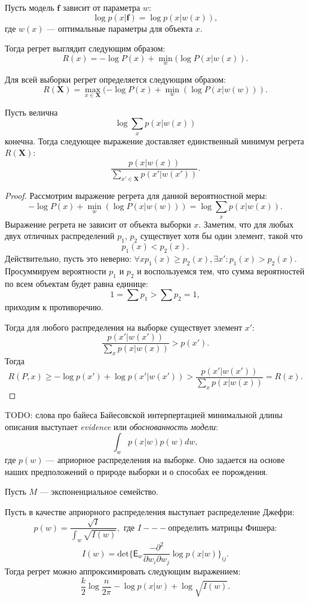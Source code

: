 \documentclass[../main.tex]{subfiles}
\begin{document}
Пусть модель $\mathbf{f}$ зависит от параметра $w$:
\[
    \log p(x|\mathbf{f}) = \log p(x|w(x)),
\]
где $w(x)$ --- оптимальные параметры для объекта $x$.

Тогда регрет выглядит следующим образом:
\[
R(x) =  - \log P(x) + \min_{w} (\log P(x|w(x)).
\]

Для всей выборки регрет определяется следующим образом:
\[
R(\mathbf{X}) =  \max_{x \in \mathbf{X}} (- \log P(x) + \min_{w} (\log P(x|w(w))).
\]


\begin{theorem}
Пусть велична
\[
    \log \sum_{x} p(x|w(x))
\]
конечна.  Тогда следующее выражение доставляет единственный минимум регрета $R(\mathbf{X})$:
\[
    \frac{p(x|w(x))}{\sum_{x' \in \mathbf{X}}p(x'|w(x')) }.
\]
\end{theorem}
\begin{proof}
Рассмотрим выражение регрета для данной вероятностной меры:
\[
    - \log P(x) + \min_{w} (\log P(x|w(w)))  = \log \sum_{x} p(x|w(x)).
\]
Выражение регрета не зависит от объекта выборки $x$. 
Заметим, что для любых двух отличных распределений  $p_1$, $p_2$ существует хотя бы один элемент, такой что 
\[
    p_1(x) < p_2(x).
\]
Действительно, пусть это неверно: $\forall x p_1(x) \geq p_2(x), \exists x': p_1(x) > p_2(x)$. Просуммируем вероятности $p_1$ и $p_2$ и воспользуемся тем, что сумма вероятностей по всем объектам будет равна единице:
\[
   1 =  \sum p_1  > \sum p_2 = 1,
\]
приходим к противоречию.

Тогда для любого распределения на выборке существует элемент $x'$:
\[
    \frac{p(x'|w(x'))}{\sum_{x}p(x|w(x)) } > p(x').
\]
Тогда 
\[
R(P, x)  \geq -\log p(x') + \log p(x'|w(x')) > \frac{p(x'|w(x'))}{\sum_{x}p(x|w(x)) } = R(x).
\]

\end{proof}

TODO: слова про байеса
Байесовской интерпертацией минимальной длины описания выступает \textit{evidence} или \textit{обоснованность модели}:
\[
    \int_{w} p(x|w) p(w)dw, 
\]
где $p(w)$ --- априорное распределения на выборке. Оно задается на основе наших предположений о природе выборки и о способах ее порождения.

\begin{theorem}
Пусть $M$ --- экспоненциальное семейство.

Пусть в качестве априорного распределения выступает распределение Джефри:
\[
    p(w) = \frac{\sqrt{I}}{\int_w \sqrt{I(w)}}, \text{ где } I --- \text{определить матрицы Фишера:}    
\]
\[
    I(w) = \text{det}\{\mathsf{E}_w \frac{-\partial^2}{\partial w_i \partial w_j } \log p(x|w) \}_{ij}.
\]
Тогда регрет можно аппроксимировать следующим выражением:
\[
\frac{k}{2}\log{\frac{n}{2\pi}} - \log p(x|w) + \log \sqrt{I(w)}.
\]

\end{theorem}
\end{document}

